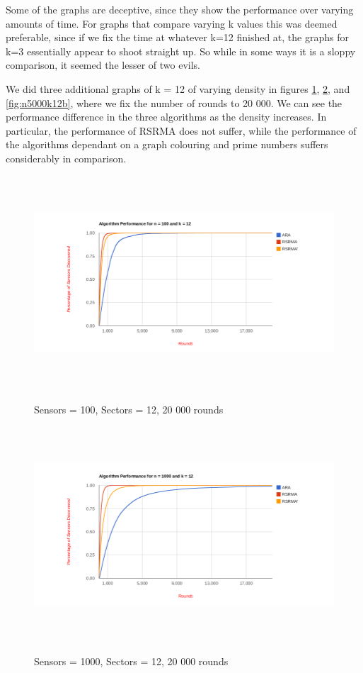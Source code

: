 \newpage

Some of the graphs are deceptive, since they show the performance over varying amounts of time. For graphs that compare varying k values this was deemed preferable, since if we fix
the time at whatever k=12 finished at, the graphs for k=3 essentially appear to shoot straight up. So while in some ways it is a sloppy comparison, it seemed the lesser of two evils. 

We did three additional graphs of k = 12 of varying density in figures \ref{fig:n100k12b}, 
\ref{fig:n1000k12b}, and \ref{fig:n5000k12b}, where we fix the number of rounds to 20 000. We can see the performance difference in the three algorithms as the density increases. In particular, the performance of RSRMA does not suffer, while the performance of the algorithms dependant on a graph colouring and prime numbers suffers considerably in comparison.

\begin{figure}[ht]
\caption{Sensors = 100, Sectors = 12, 20 000 rounds}
\includegraphics[height = 8cm]{pics/graph100k12b.png}\\[0.5cm]    
\label{fig:n100k12b}
\end{figure}

\begin{figure}[ht]
\caption{Sensors = 1000, Sectors = 12, 20 000 rounds}
\includegraphics[height = 8cm]{pics/graph1000k12b.png}\\[0.5cm]   
\label{fig:n1000k12b} 
\end{figure}

